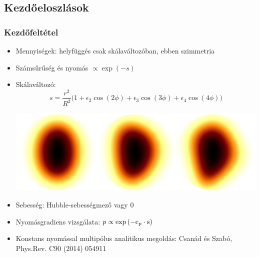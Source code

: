 \documentclass{beamer}
\begin{document}
\subsection{Kezdőeloszlások}
\begin{frame}
\frametitle{Kezdőfeltétel}
\begin{itemize}
  \setlength{\itemsep}{6pt}
\item<1-> Mennyiségek: helyfüggés csak skálaváltozóban, ebben szimmetria
\item<1-> Számsűrűség és nyomás \large{$\propto \exp{(-s)}$}
\item<1-> Skálaváltozó: 
\begin{equation*}
s=\frac{r^2}{R^2}\Big(1+\epsilon_2\cos(2\phi)+\epsilon_3\cos(3\phi)+\epsilon_4\cos(4\phi)\Big)
\end{equation*}
\begin{center}
\includegraphics[scale=0.15]{pic/ic}
\end{center}
\item<1-> Sebesség: Hubble-sebességmező vagy $0$
\item<1-> Nyomásgradiens vizsgálata: \large{$p \propto \exp{(-\rm{c_p}\cdot s)}$}
\item<1-> Konstans nyomással multipólus analitikus megoldás: Csanád és Szabó, \\Phys.Rev. C90 (2014) 054911
\end{itemize}
\end{frame}
\end{document}
